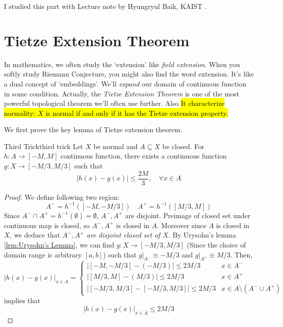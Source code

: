 \documentclass[12pt, a4paper, twoside]{article}
\theoremstyle{plain}
\begin{document}
I studied this part with Lecture note by Hyungryul Baik, KAIST \cite{Lecture01}. 

\newpage 

\section{Tietze Extension Theorem}

In mathematics, we often study the \lq extension' like \textit{field extension}. 
When you softly study Riemann Conjecture, you might also find the word extension. 
It's like a dual concept of \lq embeddings'. We'll \textit{expand} our domain of continuous function in some condition. 
Actually, the \textit{Tietze Extension Theorem} is one of the most powerful topological theorem we'll often use further. 
Also \hl{It characterize normality: $X$ is normal if and only if it has the Tietze extension property. }

We first prove the key lemma of Tietze extension theorem. 

\begin{lem}{Third Trick}{third trick}
    Let $X$ be normal and $A \subseteq X$ be closed. For $h: A \rightarrow [-M, M]$ continuous function, 
    there exists a continuous function $g: X \rightarrow [-M/3, M/3]$ such that 
    \[\left|h(x) - g(x)\right| \leq \frac{2M}{3}, \quad \forall x \in A\]
\end{lem}

\begin{proof}
    We define following two region: 
    \[A^{-} = h^{-1}([-M, -M/3]) \quad A^+ = h^{-1}([M/3, M])\]
    Since $A^- \cap A^+ = h^{-1}(\emptyset) = \emptyset$, $A^-, A^+$ are disjoint. Preimage of closed set under continuous map is closed, so $A^-, A^+$ is closed in $A$. 
    Moreover since $A$ is closed in $X$, we deduce that \textit{$A^-, A^+$ are disjoint closed set of $X$}. 
    By Urysohn's lemma \ref{lem:Urysohn's Lemma}, we can find $g: X \rightarrow [-M/3, M/3]$ (Since the choice of domain range is arbitrary $[a, b]$) 
    such that $g|_{A^-} \equiv -M/3$ and $g|_{A^+} \equiv M/3$. 
    Then, 
    \[|h(x) - g(x)|_{x \in A} = \begin{cases}
        \big|[-M, -M/3] - (-M/3)\big| \leq 2M/3 & x \in A^- \\ 
        \big|[M/3, M] - (M/3)\big| \leq 2M/3 & x \in A^+ \\ 
        \big|[-M/3, M/3] - [-M/3, M/3]\big| \leq 2M/3 & x \in A \setminus (A^- \cup A^+)
    \end{cases} \]
    implies that 
    \[|h(x) - g(x)|_{x \in A} \leq 2M/3\]
\end{proof}
\end{document}

